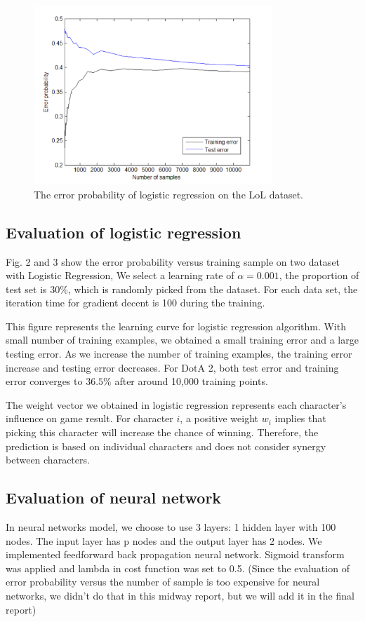 \documentclass[conference]{IEEEtran}
\begin{document}
\begin{figure}[t]
  \centering
    \includegraphics[width=90mm]{lol_logreg_error.pdf}
  \caption{The error probability of logistic regression on the LoL dataset.}
  \label{fig:lol_log}
\end{figure}



\subsection{Evaluation of logistic regression}

Fig. 2 and 3 show the error probability versus training sample on two dataset with Logistic Regression, We select a learning rate of $\alpha = 0.001$, the proportion of test set is 30\%, which is randomly picked from the dataset. For each data set, the iteration time for gradient decent is 100 during the training.

This figure represents the learning curve for logistic regression algorithm. With small number of training examples, we obtained a small training error and a large testing error. As we increase the number of training examples, the training error increase and testing error decreases. For DotA 2, both test error and training error converges to $36.5\%$ after around 10,000 training points.

The weight vector we obtained in logistic regression represents each character's influence on game result. For character $i$, a positive weight $w_i$ implies that picking this character will increase the chance of winning. Therefore, the prediction is based on individual characters and does not consider synergy between characters.

\subsection{Evaluation of neural network}
In neural networks model, we choose to use 3 layers: 1 hidden layer with 100 nodes. The input layer has p nodes and the output layer has 2 nodes. We implemented feedforward back propagation neural network. Sigmoid transform was applied and lambda in cost function was set to 0.5. (Since the evaluation of error probability versus the number of sample is too expensive for neural networks, we didn't do that in this midway report, but we will add it in the final report)
\end{document}
